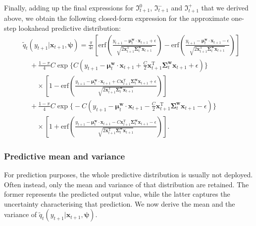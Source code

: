 Finally, adding up the final expressions for $\mathfrak{I}_{t+1}^0$, $\mathfrak{I}_{t+1}^-$ and $\mathfrak{I}_{t+1}^+$ that we derived above, we obtain the following closed-form expression for the approximate one-step lookahead predictive distribution:
\begin{equation}
\begin{split}
\label{eq:pa-approx-predictive-distribution-final}
	& \widetilde{q}_{t}(y_{t+1}|\mathbf{x}_{t+1}, \boldsymbol{\psi})
	= \frac{\pi}{4\epsilon}\left[\mathrm{erf}\left(\frac{y_{t+1}-\boldsymbol{\mu}_{t}^\mathbf{w}\cdot\mathbf{x}_{t+1}+\epsilon}{\sqrt{2\mathbf{x}_{t+1}^\text{T}\boldsymbol{\Sigma}_{t}^\mathbf{w}\mathbf{x}_{t+1}}}\right) - \mathrm{erf}\left(\frac{y_{t+1}-\boldsymbol{\mu}_{t}^\mathbf{w}\cdot\mathbf{x}_{t+1}-\epsilon}{\sqrt{2\mathbf{x}_{t+1}^\text{T}\boldsymbol{\Sigma}_{t}^\mathbf{w}\mathbf{x}_{t+1}}}\right)\right]
	\\
	& \quad + \frac{1-\pi}{4}C\exp\Big\{C\left(y_{t+1} - \boldsymbol{\mu}_{t}^\mathbf{w}\cdot\mathbf{x}_{t+1} + \frac{C}{2}\mathbf{x}_{t+1}^\text{T}\boldsymbol{\Sigma}_{t}^\mathbf{w}\mathbf{x}_{t+1} + \epsilon\right)\Big\}
	\\
	& \qquad \times \left[1 - \mathrm{erf}\left(\frac{y_{t+1}-\boldsymbol{\mu}_{t}^\mathbf{w}\cdot\mathbf{x}_{t+1} + C\mathbf{x}_{t+1}^\text{T}\boldsymbol{\Sigma}_{t}^\mathbf{w}\mathbf{x}_{t+1} + \epsilon}{\sqrt{2\mathbf{x}_{t+1}^\text{T}\boldsymbol{\Sigma}_{t}^\mathbf{w}\mathbf{x}_{t+1}}}\right)\right]
	\\
	& \quad + \frac{1-\pi}{4}C\exp\Big\{-C\left(y_{t+1} - \boldsymbol{\mu}_{t}^\mathbf{w}\cdot\mathbf{x}_{t+1} - \frac{C}{2}\mathbf{x}_{t+1}^\text{T}\boldsymbol{\Sigma}_{t}^\mathbf{w}\mathbf{x}_{t+1} - \epsilon\right)\Big\}
	\\
	& \qquad \times \left[1 + \mathrm{erf}\left(\frac{y_{t+1}-\boldsymbol{\mu}_{t}^\mathbf{w}\cdot\mathbf{x}_{t+1} - C\mathbf{x}_{t+1}^\text{T}\boldsymbol{\Sigma}_{t}^\mathbf{w}\mathbf{x}_{t+1} - \epsilon}{\sqrt{2\mathbf{x}_{t+1}^\text{T}\boldsymbol{\Sigma}_{t}^\mathbf{w}\mathbf{x}_{t+1}}}\right)\right].
\end{split}
\end{equation}

\subsubsection{Predictive mean and variance}

For prediction purposes, the whole predictive distribution is usually not deployed. Often instead, only the mean and variance of that distribution are retained. The former represents the predicted output value, while the latter captures the uncertainty characterising that prediction. We now derive the mean and the variance of $\widetilde{q}_{t}(y_{t+1}|\mathbf{x}_{t+1}, \boldsymbol{\psi})$.

